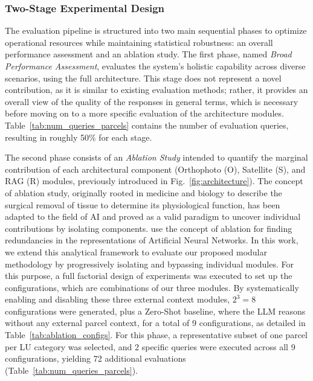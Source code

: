 \documentclass[preprint,review,12pt,authoryear]{elsarticle}
\begin{document}
\subsubsection{Two-Stage Experimental Design}
The evaluation pipeline is structured into two main sequential phases to optimize operational resources while maintaining statistical robustness: an overall performance assessment and an ablation study. The first phase, named \textit{Broad Performance Assessment}, evaluates the system's holistic capability across diverse scenarios, using the full architecture. This stage does not represent a novel contribution, as it is similar to existing evaluation methods; rather, it provides an overall view of the quality of the responses in general terms, which is necessary before moving on to a more specific evaluation of the architecture modules. Table~\ref{tab:num_queries_parcels} contains the number of evaluation queries, resulting in roughly 50$\%$ for each stage.

The second phase consists of an \textit{Ablation Study} intended to quantify the marginal contribution of each architectural component (Orthophoto (O), Satellite (S), and RAG (R) modules, previously introduced in Fig.~\ref{fig:architecture}). The concept of ablation study, originally rooted in medicine and biology to describe the surgical removal of tissue to determine its physiological function, has been adapted to the field of AI and proved as a valid paradigm to uncover individual contributions by isolating components. \citet{meyes_ablation_2020} use the concept of ablation for finding redundancies in the representations of Artificial Neural Networks. In this work, we extend this analytical framework to evaluate our proposed modular methodology by progressively isolating and bypassing individual modules. For this purpose, a full factorial design of experiments was executed to set up the configurations, which are combinations of our three modules. By systematically enabling and disabling these three external context modules, $2^3 = 8$ configurations were generated, plus a Zero-Shot baseline, where the LLM reasons without any external parcel context, for a total of 9 configurations, as detailed in Table~\ref{tab:ablation_configs}. For this phase, a representative subset of one parcel per LU category was selected, and 2 specific queries were executed across all 9 configurations, yielding 72 additional evaluations (Table~\ref{tab:num_queries_parcels}).
\end{document}
